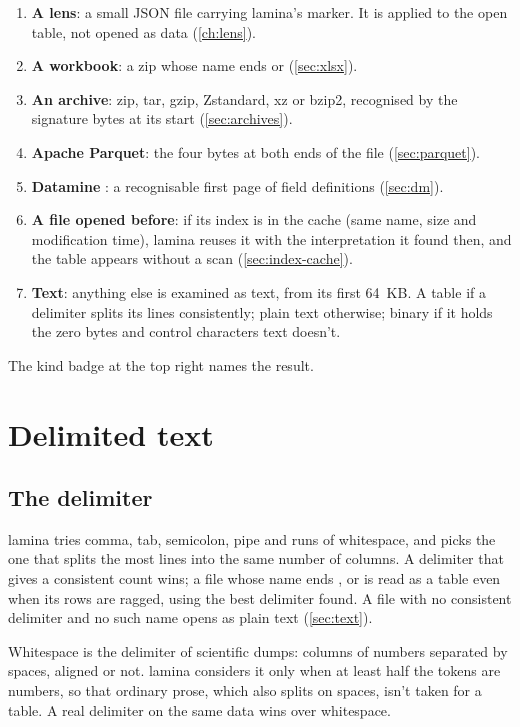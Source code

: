 \begin{enumerate}
\item \textbf{A lens}: a small JSON file carrying lamina's marker. It is applied to the open table, not
opened as data (\cref{ch:lens}).
\item \textbf{A workbook}: a zip whose name ends  or  (\cref{sec:xlsx}).
\item \textbf{An archive}: zip, tar, gzip, Zstandard, xz or bzip2, recognised by the signature bytes at
its start (\cref{sec:archives}).
\item \textbf{Apache Parquet}: the four bytes  at both ends of the file
(\cref{sec:parquet}).
\item \textbf{Datamine }: a recognisable first page of field definitions (\cref{sec:dm}).
\item \textbf{A file opened before}: if its index is in the cache (same name, size and modification
time), lamina reuses it with the interpretation it found then, and the table appears without a scan
(\cref{sec:index-cache}).
\item \textbf{Text}: anything else is examined as text, from its first 64~KB. A table if a delimiter
splits its lines consistently; plain text otherwise; binary if it holds the zero bytes and control
characters text doesn't.
\end{enumerate}

The kind badge at the top right names the result.

\section{Delimited text}\label{sec:delimited}

\subsection{The delimiter}

lamina tries comma, tab, semicolon, pipe and runs of whitespace, and picks the one that splits the most
lines into the same number of columns. A delimiter that gives a consistent count wins; a file whose name
ends ,  or  is read as a table even when its rows are ragged, using the
best delimiter found. A file with no consistent delimiter and no such name opens as plain text
(\cref{sec:text}).

Whitespace is the delimiter of scientific dumps: columns of numbers separated by spaces, aligned or not.
lamina considers it only when at least half the tokens are numbers, so that ordinary prose, which also
splits on spaces, isn't taken for a table. A real delimiter on the same data wins over whitespace.

